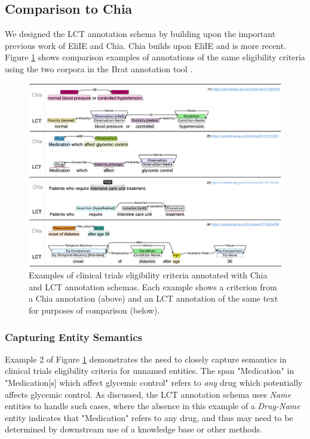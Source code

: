 \documentclass[../main.tex]{subfiles}
\begin{document}
\subsection{Comparison to Chia}

We designed the LCT annotation schema by building upon the important previous work of EliIE and Chia. Chia builds upon EliIE and is more recent. Figure \ref{fig_chia_vs_lct} shows comparison examples of annotations of the same eligibility criteria using the two corpora in the Brat annotation tool \cite{stenetorp2012brat}. \\

\begin{figure}[h!]
  \includegraphics[scale=0.52]{Figures/3_lct_corpus/chia_vs_lct.pdf}  
    \caption{Examples of clinical trials eligibility criteria annotated with Chia and LCT annotation schemas. Each example shows a criterion from a Chia annotation (above) and an LCT annotation of the same text for purposes of comparison (below).}
\label{fig_chia_vs_lct}
\end{figure}

\subsubsection{Capturing Entity Semantics}
\noindent Example 2 of Figure \ref{fig_chia_vs_lct} demonstrates the need to closely capture semantics in clinical trials eligibility criteria for unnamed entities. The span "Medication" in "Medication[s] which affect glycemic control" refers to \textit{any} drug which potentially affects glycemic control. As discussed, the LCT annotation schema uses \textit{Name} entities to handle such cases, where the absence in this example of a \textit{Drug-Name} entity indicates that "Medication" refers to any drug, and thus may need to be determined by downstream use of a knowledge base or other methods. \\
\end{document}
